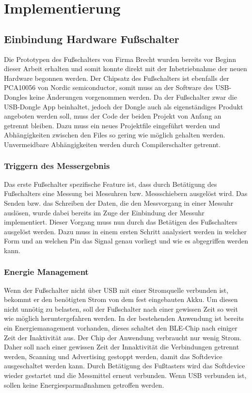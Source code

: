 \section{Implementierung}


\subsection{Einbindung Hardware Fußschalter}
Die Prototypen des Fußschalters von Firma Brecht wurden bereits vor Beginn dieser Arbeit erhalten und somit konnte direkt mit der Inbetriebnahme der neuen Hardware begonnen werden. Der Chipsatz des Fußschalters ist ebenfalls der PCA10056 von Nordic semiconductor, somit muss an der Software des USB-Dongles keine Änderungen vorgenommen werden. Da der Fußschalter zwar die USB-Dongle App beinhaltet, jedoch der Dongle auch als eigenständiges Produkt angeboten werden soll, muss der Code der beiden Projekt von Anfang an getrennt bleiben. Dazu muss ein neues Projektfile eingeführt werden und Abhängigkeiten zwischen den Files so gering wie möglich gehalten werden. Unvermeidbare Abhängigkeiten werden durch Compilerschalter getrennt. 

\subsubsection{Triggern des Messergebnis}
Das erste Fußschalter spezifische Feature ist, dass durch Betätigung des Fußschalters eine Messung bei Messuhren bzw. Messschiebern ausgelöst wird. Das Senden bzw. das Schreiben der Daten, die den Messvorgang in einer Messuhr auslösen, wurde dabei bereits im Zuge der Einbindung der Messuhr implementiert. Dieser Vorgang muss nun durch das Betätigen des Fußschalters ausgelöst werden. Dazu muss in einem ersten Schritt analysiert werden in welcher Form und an welchen Pin das Signal genau vorliegt und wie es abgegriffen werden kann.  

\subsubsection{Energie Management}
Wenn der Fußschalter nicht über USB mit einer Stromquelle verbunden ist, bekommt er den benötigten Strom von dem fest eingebauten Akku. Um diesen nicht unnötig zu belasten, soll der Fußschalter nach einer gewissen Zeit so weit wie möglich heruntergefahren werden.  
In der bestehenden Anwendung ist bereits ein Energiemanagement vorhanden, dieses schaltet den BLE-Chip nach einiger Zeit der Inaktivität aus. Der Chip der Anwendung verbraucht nur wenig Strom. Daher soll nach einer gewissen Zeit der Innaktivität die Verbindungen getrennt werden, Scanning und Advertising gestoppt werden, damit das Softdevice ausgeschaltet werden kann. Durch Betätigung des Fußtasters wird das Softdevice wieder gestartet und die Messmittel erneut verbunden. Wenn USB verbunden ist, sollen keine Energiesparmaßnahmen getroffen werden. 

